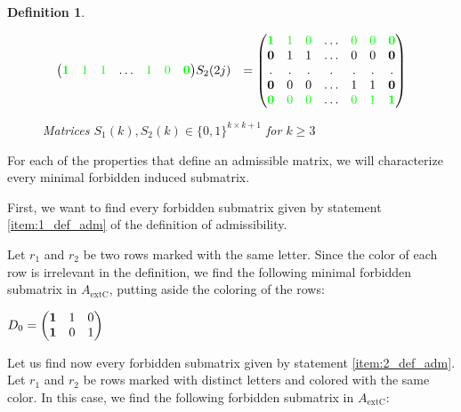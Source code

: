 \documentclass[a4paper,10pt]{report}
\theoremstyle{plain}
\theoremstyle{remark}
\theoremstyle{plain}
\newtheorem{defn}{Definition}[chapter]
\newcommand*{\extC}{\mathrm{extC}}
\begin{document}
\begin{defn}
\begin{enumerate}
\begin{figure}[h!]
\begin{align*}
\begin{pmatrix}
				\textcolor{green}{\textbf 1} & \textcolor{green}{1} & \textcolor{green}{1} & \ldots & \textcolor{green}{1} & \textcolor{green}{0 } & \textcolor{green}{\textbf 0} \\
			\end{pmatrix}
			&
			S_2(2j) &= \begin{pmatrix}
				\textcolor{green}{\textbf 1} & \textcolor{green}{1} & \textcolor{green}{0} & \ldots & \textcolor{green}{0} & \textcolor{green}{0} & \textcolor{green}{\textbf 0} \\
				\textbf 0 & 1& 1 & \ldots & 0 & 0 & \textbf 0 \\
				. & . & . & . & . & . & .\\
				\textbf 0 &0 &0 & \ldots & 1 & 1 & \textbf 0 \\
				\textcolor{green}{\textbf 0} & \textcolor{green}{0} & \textcolor{green}{0} & \ldots & \textcolor{green}{0} & \textcolor{green}{1} & \textcolor{green}{\textbf 1}\\
			\end{pmatrix}
		\end{align*}	
	\caption{Matrices $S_1(k), S_2(k) \in \{0,1\}^{k \times k+1}$ for $k \geq 3$}
\end{figure}
		
    \end{enumerate} 	
\end{defn}

\vspace{1mm}
For each of the properties that define an admissible matrix, we will characterize every minimal forbidden induced submatrix.

\vspace{1mm}
First, we want to find every forbidden submatrix given by statement \ref{item:1_def_adm} of the definition of admissibility.

Let $r_1$ and $r_2$ be two rows marked with the same letter. Since the color of each row is irrelevant in the definition, we find the following minimal forbidden submatrix in $A_{\extC}$, putting aside the coloring of the rows:

\vspace{2mm}

$D_0 = \begin{pmatrix}
\textbf 1 & 1 & 0\\
\textbf 1 & 0 & 1
\end{pmatrix}$

\vspace{3mm}

Let us find now every forbidden submatrix given by statement \ref{item:2_def_adm}.
Let $r_1$ and $r_2$ be rows marked with distinct letters and colored with the same color. In this case, we find the following forbidden submatrix in $A_{\extC}$:
\end{document}
